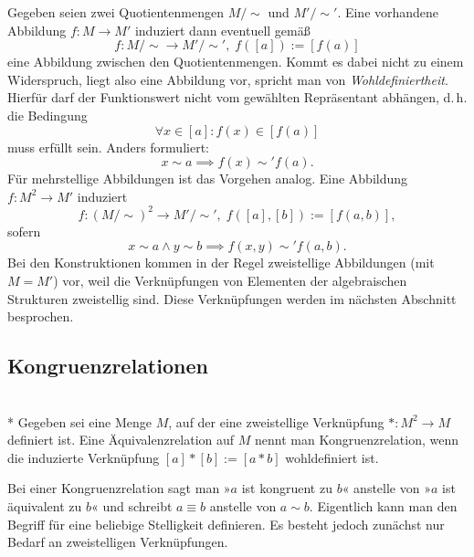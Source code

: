 Gegeben seien zwei Quotientenmengen $M/\sim$ und $M'/\sim'$.
Eine vorhandene Abbildung $f\colon M\to M'$ induziert dann
eventuell gemäß%
\begin{equation}\label{eq:induzierte-Abbildung}
f\colon M/\sim\to M'/\sim',\; f([a]):=[f(a)]
\end{equation}
eine Abbildung zwischen den Quotientenmengen. Kommt es dabei nicht
zu einem Widerspruch, liegt also eine Abbildung vor, spricht man
von \emph{Wohldefiniertheit}. Hierfür darf der Funktionswert nicht
vom gewählten Repräsentant abhängen, d.\,h. die Bedingung%
\begin{equation}
\forall x\in [a]\colon f(x)\in [f(a)]
\end{equation}
muss erfüllt sein. Anders formuliert:
\begin{equation}
x\sim a \implies f(x)\sim' f(a).
\end{equation}
Für mehrstellige Abbildungen ist das Vorgehen analog. Eine
Abbildung $f\colon M^2\to M'$ induziert%
\begin{equation}
f\colon (M/\sim)^2\to M'/\sim',\; f([a],[b]):=[f(a,b)],
\end{equation}
sofern
\begin{equation}
x\sim a\land y\sim b\implies f(x,y)\sim' f(a,b).
\end{equation}
Bei den Konstruktionen kommen in der Regel zweistellige Abbildungen
(mit $M=M'$) vor, weil die Verknüpfungen von Elementen der algebraischen
Strukturen zweistellig sind. Diese Verknüpfungen werden im nächsten
Abschnitt besprochen.

\subsection{Kongruenzrelationen}

\begin{Definition}[Kongruenzrelation]\mbox{}\\*
Gegeben sei eine Menge $M$, auf der eine zweistellige
Verknüpfung $*\colon M^2\to M$ definiert ist. Eine Äquivalenzrelation
auf $M$ nennt man Kongruenzrelation, wenn die induzierte Verknüpfung
$[a]*[b]:=[a*b]$ wohldefiniert ist.
\end{Definition}
Bei einer Kongruenzrelation sagt man »$a$ ist kongruent zu $b$«
anstelle von »$a$ ist äquivalent zu $b$« und schreibt $a\equiv b$
anstelle von $a\sim b$. Eigentlich kann man den Begriff für eine
beliebige Stelligkeit definieren. Es besteht jedoch zunächst nur Bedarf
an zweistelligen Verknüpfungen.

